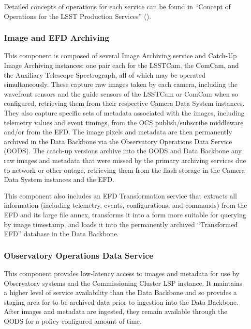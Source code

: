 \documentclass[DM,toc]{lsstdoc}
\begin{document}
Detailed concepts of operations for each service can be found in
``Concept of Operations for the LSST Production Services'' ().


\subsubsection{Image and EFD Archiving}\label{image-and-efd-archiving}

This component is composed of several Image Archiving service and
Catch-Up Image Archiving instances: one pair each for the LSSTCam, the
ComCam, and the Auxiliary Telescope Spectrograph, all of which may be
operated simultaneously. These capture raw images taken by each camera,
including the wavefront sensors and the guide sensors of the LSSTCam or
ComCam when so configured, retrieving them from their respective Camera
Data System instances. They also capture specific sets of metadata
associated with the images, including telemetry values and event
timings, from the OCS publish/subscribe middleware and/or from the EFD.
The image pixels and metadata are then permanently archived in the Data Backbone via the Observatory Operations Data Service (OODS).
The catch-up versions archive into the OODS and Data Backbone any raw
images and metadata that were missed by the primary archiving services
due to network or other outage, retrieving them from the flash storage
in the Camera Data System instances and the EFD.

This component also includes an EFD Transformation service that extracts
all information (including telemetry, events, configurations, and
commands) from the EFD and its large file annex, transforms it into a
form more suitable for querying by image timestamp, and loads it into
the permanently archived ``Transformed EFD'' database in the Data
Backbone.

\subsubsection{Observatory Operations Data Service}\label{obs-ops-data}

This component provides low-latency access to images and metadata for use by Observatory systems and the Commissioning Cluster LSP instance.
It maintains a higher level of service availability than the Data Backbone and so provides a staging area for to-be-archived data prior to ingestion into the Data Backbone.
After images and metadata are ingested, they remain available through the OODS for a policy-configured amount of time.
\end{document}
